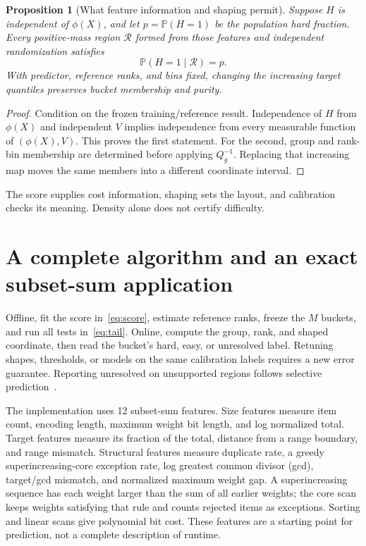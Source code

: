 \documentclass[10pt,letterpaper]{article}
\newtheorem{proposition}[theorem]{Proposition}
\newcommand{\Prb}{\mathbb P}
\begin{document}
\begin{proposition}[What feature information and shaping permit]\label{prop:limits}
Suppose $H$ is independent of $\phi(X)$, and let $p=\Prb(H=1)$ be the population hard fraction. Every positive-mass region $\mathcal R$ formed from those features and independent randomization satisfies
\[
 \Prb(H=1\mid\mathcal R)=p.
\]
With predictor, reference ranks, and bins fixed, changing the increasing target quantiles preserves bucket membership and purity.
\end{proposition}
\begin{proof}
Condition on the frozen training/reference result. Independence of $H$ from $\phi(X)$ and independent $V$ implies independence from every measurable function of $(\phi(X),V)$. This proves the first statement. For the second, group and rank-bin membership are determined before applying $Q_g^{-1}$. Replacing that increasing map moves the same members into a different coordinate interval.
\end{proof}
The score supplies cost information, shaping sets the layout, and calibration checks its meaning. Density alone does not certify difficulty.

\section{A complete algorithm and an exact subset-sum application}
Offline, fit the score in~\eqref{eq:score}, estimate reference ranks, freeze the $M$ buckets, and run all tests in~\eqref{eq:tail}. Online, compute the group, rank, and shaped coordinate, then read the bucket's hard, easy, or unresolved label. Retuning shapes, thresholds, or models on the same calibration labels requires a new error guarantee. Reporting unresolved on unsupported regions follows selective prediction~\cite{selective}.

The implementation uses 12 subset-sum features. Size features measure item count, encoding length, maximum weight bit length, and log normalized total. Target features measure its fraction of the total, distance from a range boundary, and range mismatch. Structural features measure duplicate rate, a greedy superincreasing-core exception rate, log greatest common divisor (gcd), target/gcd mismatch, and normalized maximum weight gap. A superincreasing sequence has each weight larger than the sum of all earlier weights; the core scan keeps weights satisfying that rule and counts rejected items as exceptions. Sorting and linear scans give polynomial bit cost. These features are a starting point for prediction, not a complete description of runtime.
\end{document}
